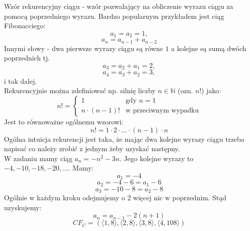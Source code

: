 \documentclass[12pt]{article}
\begin{document}
Wzór rekurencyjny ciągu - wzór pozwalający na obliczenie wyrazu ciągu za pomocą poprzedniego wyrazu. Bardzo popularnym przykładem jest ciąg Fibonacciego:
$$a_1=a_2=1,$$ 
$$a_n=a_{n-1}+a_{n-2}$$ 
Innymi słowy - dwa pierwsze wyrazy ciągu są równe $1$ a kolejne są sumą dwóch poprzednich tj. $$a_3=a_2+a_1=2,$$ $$a_4=a_3+a_2=3,$$ 
i tak dalej.\\
Rekurencyjnie można zdefiniować np. silnię liczby $n\in\mathbb{N}$ (ozn. $n!$) jako:
$$n!=\begin{cases}
1 & \text{gdy $n=1$} \\
n\cdot(n-1)! & \text{w przeciwnym wypadku}
\end{cases}$$
Jest to równoważne ogólnemu wzorowi:
$$n!=1\cdot 2\cdot\dots\cdot (n-1)\cdot n$$
Ogólna intuicja rekurencji jest taka, że mając dwa kolejne wyrazy ciągu trzeba napisać co należy zrobić z jednym żeby uzyskać następny.\\
W zadaniu mamy ciąg $a_n=-n^2-3n$. Jego kolejne wyrazy to $-4,-10,-18,-20,\dots$.
Mamy:
$$a_1=-4$$
$$a_2=-4-6=a_1-6$$
$$a_3=-10-8=a_2-8$$
Ogólnie w każdym kroku odejmujemy o $2$ więcej nic w poprzednim. Stąd uzyskujemy:
$$a_n=a_{n-1}-2(n+1)$$
$$CF_C=(\langle 1, 8\rangle,\langle 2, 8\rangle,\langle 3,8\rangle,\langle 4, 108\rangle)$$
\end{document}
